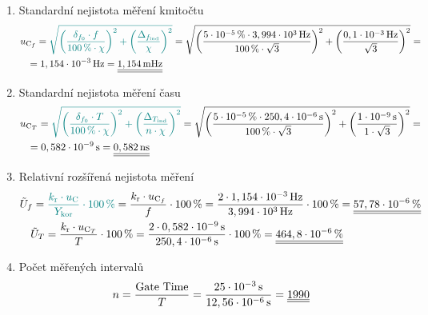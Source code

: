 \documentclass[a4paper, czech]{article}
\begin{document}
\begin{enumerate}
    \item Standardní nejistota měření kmitočtu
    \begin{multline*}
        u_{\text{C}_f} = \textcolor{teal}{\sqrt{\left(\frac{\delta_{f_0} \cdot f}{100\,\% \cdot \chi}\right)^2 + \left(\frac{\Delta_{f_\text{ind}}}{\chi}\right)^2}} = \sqrt{\left(\frac{5\cdot10^{-5}\,\% \cdot 3,994\cdot10^{3}\,\text{Hz}}{100\,\% \cdot \sqrt{3}}\right)^2 + \left(\frac{0,1\cdot10^{-3}\,\text{Hz}}{\sqrt{3}}\right)^2} = \hfill \\
        \ \ \ = 1,154\cdot10^{-3}\,\text{Hz} = \underline{\underline{1,154\,\text{mHz}}} \hfill
    \end{multline*}
    \item Standardní nejistota měření času
    \begin{multline*}
        u_{\text{C}_T} = \textcolor{teal}{\sqrt{\left(\frac{\delta_{f_0} \cdot T}{100\,\% \cdot \chi}\right)^2 + \left(\frac{\Delta_{T_\text{ind}}}{n \cdot \chi}\right)^2}} = \sqrt{\left(\frac{5\cdot10^{-5}\,\% \cdot 250,4\cdot10^{-6}\,\text{s}}{100\,\% \cdot \sqrt{3}}\right)^2 + \left(\frac{1\cdot10^{-9}\,\text{s}}{1 \cdot \sqrt{3}}\right)^2} = \hfill \\
        \ \ \ = 0,582\cdot10^{-9}\,\text{s} = \underline{\underline{0,582\,\text{ns}}} \hfill
    \end{multline*}
    \item Relativní rozšířená nejistota měření
    \begin{multline*}
        \tilde{U}_f = \textcolor{teal}{\frac{k_\text{r} \cdot u_\text{C}}{Y_\text{kor}} \cdot 100\,\%} = \frac{k_\text{r} \cdot u_{\text{C}_f}}{f} \cdot 100\,\% = \frac{2 \cdot 1,154\cdot10^{-3}\,\text{Hz}}{3,994\cdot10^{3}\,\text{Hz}} \cdot 100\,\% = \underline{\underline{57,78\cdot10^{-6}\,\%}} \hfill \\
        \ \ \ \tilde{U}_T = \frac{k_\text{r} \cdot u_{\text{C}_T}}{T} \cdot 100\,\% = \frac{2 \cdot 0,582\cdot10^{-9}\,\text{s}}{250,4\cdot10^{-6}\,\text{s}} \cdot 100\,\% = \underline{\underline{464,8\cdot10^{-6}\,\%}} \hfill
    \end{multline*}
    \item Počet měřených intervalů
    \begin{multline*}
        n = \frac{\text{Gate Time}}{T} = \frac{25\cdot10^{-3}\,\text{s}}{12,56\cdot10^{-6}\,\text{s}} = \underline{\underline{1990}} \hfill
    \end{multline*}
\end{enumerate}
\end{document}
